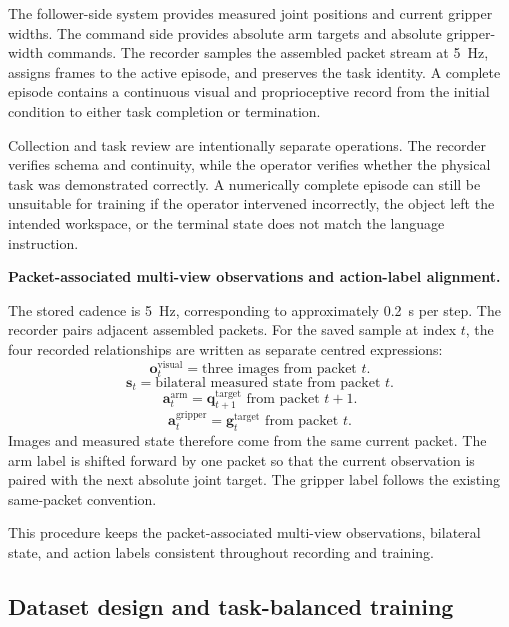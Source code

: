 The follower-side system provides measured joint positions and current gripper widths. The command side provides absolute arm targets and absolute gripper-width commands. The recorder samples the assembled packet stream at 5~Hz, assigns frames to the active episode, and preserves the task identity. A complete episode contains a continuous visual and proprioceptive record from the initial condition to either task completion or termination.

Collection and task review are intentionally separate operations. The recorder verifies schema and continuity, while the operator verifies whether the physical task was demonstrated correctly. A numerically complete episode can still be unsuitable for training if the operator intervened incorrectly, the object left the intended workspace, or the terminal state does not match the language instruction.

\medskip
\noindent\textbf{Packet-associated multi-view observations and action-label alignment.}

The stored cadence is 5~Hz, corresponding to approximately 0.2~s per step. The recorder pairs adjacent assembled packets. For the saved sample at index \(t\), the four recorded relationships are written as separate centred expressions:
\begin{equation}
\mathbf{o}^{\mathrm{visual}}_t
=\text{three images from packet }t .
\end{equation}
\begin{equation}
\mathbf{s}_t
=\text{bilateral measured state from packet }t .
\end{equation}
\begin{equation}
\mathbf{a}^{\mathrm{arm}}_t
=\mathbf q^{\mathrm{target}}_{t+1}\text{ from packet }t+1 .
\end{equation}
\begin{equation}
\mathbf{a}^{\mathrm{gripper}}_t
=\mathbf g^{\mathrm{target}}_{t}\text{ from packet }t .
\end{equation}
Images and measured state therefore come from the same current packet. The arm label is shifted forward by one packet so that the current observation is paired with the next absolute joint target. The gripper label follows the existing same-packet convention.

This procedure keeps the packet-associated multi-view observations, bilateral
state, and action labels consistent throughout recording and training.

\subsection{Dataset design and task-balanced training}

